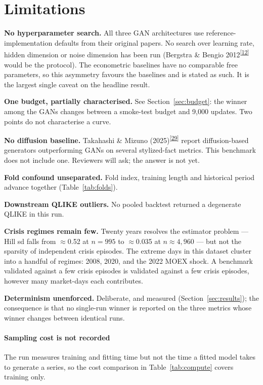 \documentclass[11pt,a4paper]{article}
\makeatletter
\newcommand{\tcite}[1]{\textsuperscript{[\hyperlink{R:#1}{#1}]}}
\DeclareRobustCommand{\_}{\ifmmode\nfss@text{\textunderscore}\else\textunderscore\allowbreak\fi}
\makeatother
\begin{document}
\section{Limitations}
\label{sec:limitations}
\textbf{No hyperparameter search.} All three GAN architectures use reference-implementation defaults from their original papers. No search over learning rate, hidden dimension or noise dimension has been run (Bergstra \& Bengio 2012\tcite{12} would be the protocol). The econometric baselines have no comparable free parameters, so this asymmetry favours the baselines and is stated as such. It is the largest single caveat on the headline result.

\textbf{One budget, partially characterised.} See Section~\ref{sec:budget}: the winner among the GANs changes between a smoke-test budget and 9,000 updates. Two points do not characterise a curve.

\textbf{No diffusion baseline.} Takahashi \& Mizuno (2025)\tcite{29} report diffusion-based generators outperforming GANs on several stylized-fact metrics. This benchmark does not include one. Reviewers will ask; the answer is not yet.

\textbf{Fold confound unseparated.} Fold index, training length and historical period advance together (Table~\ref{tab:folds}).

\textbf{Downstream QLIKE outliers.} No pooled backtest returned a degenerate QLIKE in this run.

\textbf{Crisis regimes remain few.} Twenty years resolves the estimator problem --- Hill sd falls from $\approx$0.52 at $n=995$ to $\approx$0.035 at $n\approx4{,}960$ --- but not the sparsity of independent crisis episodes. The extreme days in this dataset cluster into a handful of regimes: 2008, 2020, and the 2022 MOEX shock. A benchmark validated against a few crisis episodes is validated against a few crisis episodes, however many market-days each contributes.

\textbf{Determinism unenforced.} Deliberate, and measured (Section~\ref{sec:results}); the consequence is that no single-run winner is reported on the three metrics whose winner changes between identical runs.

\paragraph{Sampling cost is not recorded} The run measures training and fitting time but not the time a fitted model takes to generate a series, so the cost comparison in Table~\ref{tab:compute} covers training only.
\end{document}
